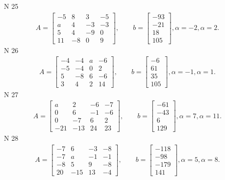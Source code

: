 \documentclass[11pt]{report}
\begin{document}
N 25
\begin{align*}
 A = \left[\begin{matrix}-5 & 8 & 3 & -5\\a & 4 & -3 & -3\\5 & 4 & -9 & 0\\11 & -8 & 0 & 9\end{matrix}\right],
    \qquad b = \left[\begin{matrix}-93\\-21\\18\\105\end{matrix}\right], \alpha = -2, \alpha = 2. 
 \end{align*}
N 26
\begin{align*}
 A = \left[\begin{matrix}-4 & -4 & a & -6\\-5 & -4 & 0 & 2\\5 & -8 & 6 & -6\\3 & 4 & 2 & 14\end{matrix}\right],
    \qquad b = \left[\begin{matrix}-6\\61\\35\\105\end{matrix}\right], \alpha = -1, \alpha = 1. 
 \end{align*}
N 27
\begin{align*}
 A = \left[\begin{matrix}a & 2 & -6 & -7\\0 & 6 & -1 & -6\\0 & -7 & 6 & 2\\-21 & -13 & 24 & 23\end{matrix}\right],
    \qquad b = \left[\begin{matrix}-61\\-43\\6\\129\end{matrix}\right], \alpha = 7, \alpha = 11. 
 \end{align*}
N 28
\begin{align*}
 A = \left[\begin{matrix}-7 & 6 & -3 & -8\\-7 & a & -1 & -1\\-8 & 5 & 9 & -8\\20 & -15 & 13 & -4\end{matrix}\right],
    \qquad b = \left[\begin{matrix}-118\\-98\\-179\\141\end{matrix}\right], \alpha = 5, \alpha = 8. 
 \end{align*}
\end{document}
